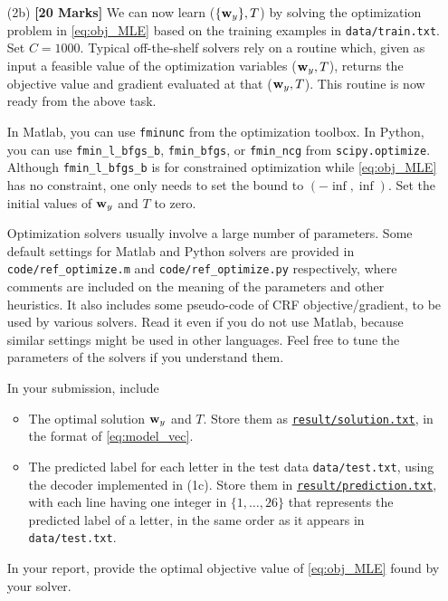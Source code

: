 \documentclass[11pt]{report}
\begin{document}
\begin{itemize}
	{\bf Provide} the value of $\frac{1}{n} \sum_{i=1}^n \log p(\yvec^i | X^i)$ for this case in your report.
	
	For your reference,
	in your instructor's Matlab implementation (65 lines),
	it takes 5 seconds to compute the gradient on the whole training set.
	Single core.
	
	
	\item[(2b)] {\bf [20 Marks]} We can now learn ($\{\mathbf{\boldsymbol{w}}_y\}, T$) by solving the optimization problem in \eqref{eq:obj_MLE} based on the training examples in \verb#data/train.txt#.
	Set $C = 1000$.
	Typical off-the-shelf solvers rely on a routine which, given as input a feasible value of the optimization variables ($\mathbf{\boldsymbol{w}}_y, T$), returns the objective value and gradient evaluated at that ($\mathbf{\boldsymbol{w}}_y, T$). This routine is now ready from the above task.
	
	In Matlab, you can use \verb#fminunc# from the optimization toolbox. In Python, you can use \verb#fmin_l_bfgs_b#, \verb#fmin_bfgs#, or \verb#fmin_ncg# from \verb#scipy.optimize#.
	Although \verb#fmin_l_bfgs_b# is for constrained optimization while \eqref{eq:obj_MLE} has no constraint, one only needs to set the bound to $(-\inf, \inf)$.  Set the initial values of $\mathbf{\boldsymbol{w}}_y$ and $T$ to zero.
	
	Optimization solvers usually involve a large number of parameters.
	Some default settings for Matlab and Python solvers are provided in \verb#code/ref_optimize.m# and \verb#code/ref_optimize.py# respectively,
	where comments are included on the meaning of the parameters and other heuristics.
	It also includes some pseudo-code of CRF objective/gradient,
	to be used by various solvers.
	Read it even if you do not use Matlab, because similar settings might be used in other languages.
	Feel free to tune the parameters of the solvers if you understand them.
	
	In your submission, include
	\begin{itemize}
		\item The optimal solution $\mathbf{\boldsymbol{w}}_y$ and $T$.  Store them as \underline{\tt{result/solution.txt}}, in the format of \eqref{eq:model_vec}.
		\item The predicted label for each letter in the test data \verb#data/test.txt#, using the decoder implemented in (1c).
		Store them in \underline{\tt{result/prediction.txt}},
		with each line having one integer in $\{1,\ldots, 26\}$ that represents the predicted label of a letter, in the same order as it appears in \verb#data/test.txt#.
	\end{itemize}
	In your report, provide the optimal objective value of \eqref{eq:obj_MLE} found by your solver.
\end{itemize}
\end{document}
